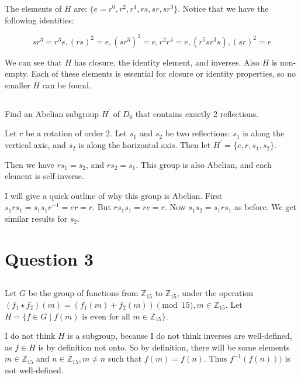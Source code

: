 \documentclass[a4paper,12pt]{article}
\begin{document}
The elements of $H$ are: $\{ e = r^0, r^2, r^4, rs, sr, sr^3 \}$. Notice that we have the following identities:

\begin{equation*}
sr^3 = r^3s, (rs)^2 = e, (sr^3)^2 = e, r^2r^4 = e, (r^5sr^3s), (sr)^2 = e
\end{equation*}

We can see that $H$ has closure, the identity element, and inverses. Also $H$ is non-empty. Each of these elements is essential for closure or identity properties, so no smaller $H$ can be found.

\subsection{}

Find an Abelian subgroup $H^{\prime}$ of $D_6$ that contains exactly 2 reflections.

Let $r$ be a rotation of order 2. Let $s_1$ and $s_2$ be two reflections: $s_1$ is along the vertical axis, and $s_2$ is along the horizontal axis. Then let $H^{\prime} = \{e, r, s_1, s_2\}$.

Then we have $rs_1 = s_2$, and $rs_2 = s_1$. This group is also Abelian, and each element is self-inverse.

I will give a quick outline of why this group is Abelian. First $s_1rs_1 = s_1s_1r^{-1} = er = r$. But $rs_1s_1 = re = r$. Now $s_1s_2 = s_1rs_1$ as before. We get similar results for $s_2$.

\section{Question 3}

\subsection{}

Let $G$ be the group of functions from $\mathbb{Z}_{15}$ to $\mathbb{Z}_{15}$, under the operation $(f_1 \star f_2)(m) = (f_1(m) + f_2(m)) \pmod{15}, m \in \mathbb{Z}_{15}$. Let $H = \{f \in G \mid f(m) \text{ is even for all } m \in \mathbb{Z}_{15}\}$.

I do not think $H$ is a subgroup, because I do not think inverses are well-defined, as $f \in H$ is by definition not onto. So by definition, there will be some elements $m \in \mathbb{Z}_15$ and $n \in \mathbb{Z}_15, m \neq n$ such that $f(m) = f(n)$. Thus $f^{-1}(f(n)))$ is not well-defined.
\end{document}
